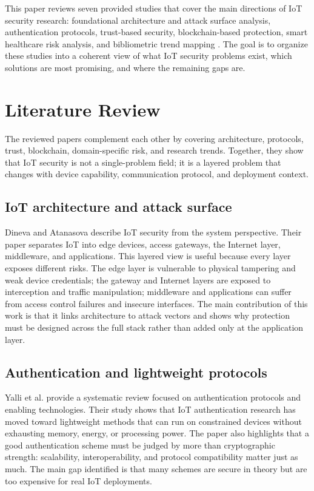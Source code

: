 \documentclass[conference]{IEEEtran}
\begin{document}
This paper reviews seven provided studies that cover the main directions of IoT security research: foundational architecture and attack surface analysis, authentication protocols, trust-based security, blockchain-based protection, smart healthcare risk analysis, and bibliometric trend mapping \cite{dineva,qadir,yalli,trust,bibliometric,healthcare,tradeoff}. The goal is to organize these studies into a coherent view of what IoT security problems exist, which solutions are most promising, and where the remaining gaps are.

\section{Literature Review}
The reviewed papers complement each other by covering architecture, protocols, trust, blockchain, domain-specific risk, and research trends. Together, they show that IoT security is not a single-problem field; it is a layered problem that changes with device capability, communication protocol, and deployment context.

\subsection{IoT architecture and attack surface}
Dineva and Atanasova \cite{dineva} describe IoT security from the system perspective. Their paper separates IoT into edge devices, access gateways, the Internet layer, middleware, and applications. This layered view is useful because every layer exposes different risks. The edge layer is vulnerable to physical tampering and weak device credentials; the gateway and Internet layers are exposed to interception and traffic manipulation; middleware and applications can suffer from access control failures and insecure interfaces. The main contribution of this work is that it links architecture to attack vectors and shows why protection must be designed across the full stack rather than added only at the application layer.

\subsection{Authentication and lightweight protocols}
Yalli et al. \cite{yalli} provide a systematic review focused on authentication protocols and enabling technologies. Their study shows that IoT authentication research has moved toward lightweight methods that can run on constrained devices without exhausting memory, energy, or processing power. The paper also highlights that a good authentication scheme must be judged by more than cryptographic strength: scalability, interoperability, and protocol compatibility matter just as much. The main gap identified is that many schemes are secure in theory but are too expensive for real IoT deployments.
\end{document}

